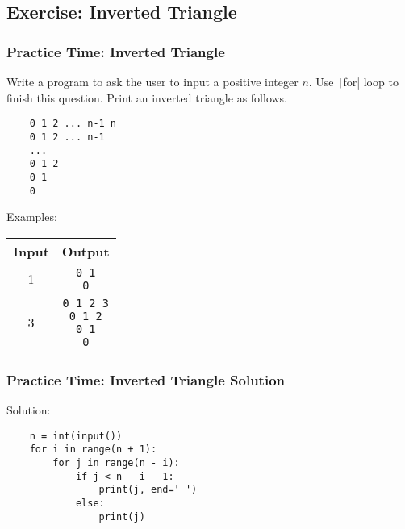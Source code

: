 \documentclass{beamer}
\newcommand{\python}[1]{\texttt|#1|}
\begin{document}
\subsection{Exercise: Inverted Triangle}
\begin{frame}[fragile]
    \frametitle{Practice Time: Inverted Triangle}

    Write a program to ask the user to input a positive integer $n$.
    Use \python{for} loop to finish this question.
    Print an inverted triangle as follows.
    \begin{verbatim}
    0 1 2 ... n-1 n
    0 1 2 ... n-1
    ...
    0 1 2
    0 1
    0
    \end{verbatim}

    Examples:
    \begin{center}
        \begin{tabular}{|c|c|}
            \hline
            Input & Output                     \\ \hline
            1     & \makecell[tl]{\texttt{0 1} \\ \texttt{0}}       \\ \hline
            3     &
            \makecell[tl]{\texttt{0 1 2 3}     \\ \texttt{0 1 2} \\ \texttt{0 1} \\ \texttt{0}}
            \\ \hline
        \end{tabular}
    \end{center}
\end{frame}
\begin{frame}[fragile]
    \frametitle{Practice Time: Inverted Triangle Solution}

    Solution:
    \begin{verbatim}
    n = int(input())
    for i in range(n + 1):
        for j in range(n - i):
            if j < n - i - 1:
                print(j, end=' ')
            else:
                print(j)
    \end{verbatim}
\end{frame}
\end{document}
